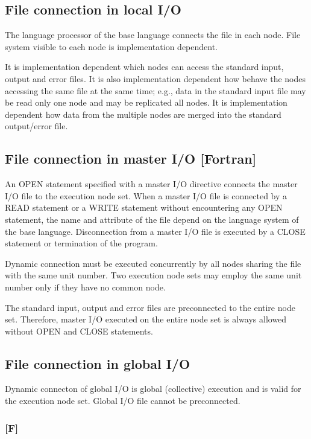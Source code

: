  \subsection{File connection in local I/O}

  The language processor of the base language connects the file in each
  node.
  File system visible to each node is implementation dependent.

  It is implementation dependent which nodes can access the standard
  input, output and error files.
  It is also implementation dependent how behave the nodes accessing the
  same file at the same time; e.g., data in the standard input file may
  be read only one node and may be replicated all nodes.
  It is implementation dependent how data from the multiple nodes are
  merged into the standard output/error file.
  
  \subsection{File connection in master I/O [Fortran]}

  An OPEN statement specified with a master I/O directive connects the
  master I/O file to the execution node set.
  When a master I/O file is connected by a READ statement or a WRITE
  statement without encountering any OPEN statement, the name and
  attribute of the file depend on the language system of the base
  language.
  Disconnection from a master I/O file is executed by a CLOSE statement
  or termination of the program.

  Dynamic connection must be executed concurrently by all nodes sharing
  the file with the same unit number.
  Two execution node sets may employ the same unit number only if they
  have no common node.

  The standard input, output and error files are preconnected to the
  entire node set.
  Therefore, master I/O executed on the entire node set is always
  allowed without OPEN and CLOSE statements.


  \subsection{File connection in global I/O}

  Dynamic connecton of global I/O is global (collective) execution and
  is valid for the execution node set.
  Global I/O file cannot be preconnected.

  \subsubsection*{[F]}

